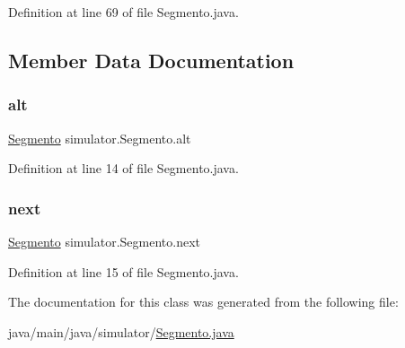 Definition at line 69 of file Segmento.\+java.



\subsection{Member Data Documentation}
\mbox{\label{classsimulator_1_1_segmento_a0ac22ab701cfb44a6ca41cc831df2695}} 
\subsubsection{\texorpdfstring{alt}{alt}}
{\footnotesize\ttfamily \mbox{\hyperlink{classsimulator_1_1_segmento}{Segmento}} simulator.\+Segmento.\+alt}



Definition at line 14 of file Segmento.\+java.

\mbox{\label{classsimulator_1_1_segmento_a1cceb01f5ffd65b3a53422fa9e05913c}} 
\subsubsection{\texorpdfstring{next}{next}}
{\footnotesize\ttfamily \mbox{\hyperlink{classsimulator_1_1_segmento}{Segmento}} simulator.\+Segmento.\+next}



Definition at line 15 of file Segmento.\+java.



The documentation for this class was generated from the following file\+:\begin{DoxyCompactItemize}
\item 
java/main/java/simulator/\mbox{\hyperlink{_segmento_8java}{Segmento.\+java}}\end{DoxyCompactItemize}
